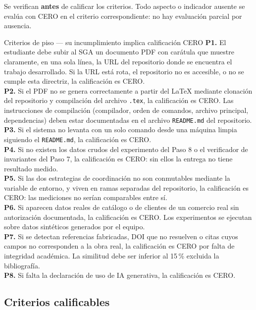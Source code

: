 \documentclass[11pt,a4paper]{article}
\begin{document}
	Se verifican \textbf{antes} de calificar los criterios. Todo aspecto o indicador ausente se evalúa con CERO en el criterio correspondiente: no hay evaluación parcial por ausencia.
	
	\begin{pisoBox}{Criterios de piso --- su incumplimiento implica calificación CERO}
		\textbf{P1.} El estudiante debe subir al SGA un documento PDF con carátula que muestre claramente, en una sola línea, la URL del repositorio donde se encuentra el trabajo desarrollado. Si la URL está rota, el repositorio no es accesible, o no se cumple esta directriz, la calificación es CERO.\\[5pt]
		\textbf{P2.} Si el PDF no se genera correctamente a partir del LaTeX mediante clonación del repositorio y compilación del archivo \texttt{.tex}, la calificación es CERO. Las instrucciones de compilación (compilador, orden de comandos, archivo principal, dependencias) deben estar documentadas en el archivo \texttt{README.md} del repositorio.\\[5pt]
		\textbf{P3.} Si el sistema no levanta con un solo comando desde una máquina limpia siguiendo el \texttt{README.md}, la calificación es CERO.\\[5pt]
		\textbf{P4.} Si no existen los datos crudos del experimento del Paso 8 o el verificador de invariantes del Paso 7, la calificación es CERO: sin ellos la entrega no tiene resultado medido.\\[5pt]
		\textbf{P5.} Si las dos estrategias de coordinación no son conmutables mediante la variable de entorno, y viven en ramas separadas del repositorio, la calificación es CERO: las mediciones no serían comparables entre sí.\\[5pt]
		\textbf{P6.} Si aparecen datos reales de catálogo o de clientes de un comercio real sin autorización documentada, la calificación es CERO. Los experimentos se ejecutan sobre datos sintéticos generados por el equipo.\\[5pt]
		\textbf{P7.} Si se detectan referencias fabricadas, DOI que no resuelven o citas cuyos campos no corresponden a la obra real, la calificación es CERO por falta de integridad académica. La similitud debe ser inferior al 15\,\% excluida la bibliografía.\\[5pt]
		\textbf{P8.} Si falta la declaración de uso de IA generativa, la calificación es CERO.
	\end{pisoBox}
	
	\subsection{Criterios calificables}
	
\end{document}
